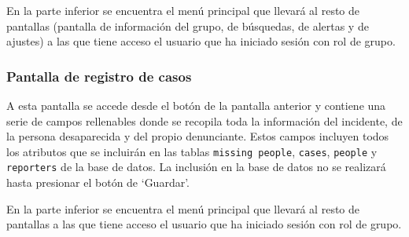      En la parte inferior se encuentra el menú principal que llevará al resto de pantallas (pantalla de información del grupo, de búsquedas, de alertas y de ajustes) a las que tiene acceso el usuario que ha iniciado sesión con rol de grupo.





     \subsubsection{Pantalla de registro de casos}
     A esta pantalla se accede desde el botón de la pantalla anterior y contiene una serie de campos rellenables donde se recopila toda la información del incidente, de la persona desaparecida y del propio denunciante. Estos campos incluyen todos los atributos que se incluirán en las tablas \texttt{missing people}, \texttt{cases}, \texttt{people} y \texttt{reporters} de la base de datos. La inclusión en la base de datos no se realizará hasta presionar el botón de `Guardar'.

     En la parte inferior se encuentra el menú principal que llevará al resto de pantallas a las que tiene acceso el usuario que ha iniciado sesión con rol de grupo.



     

